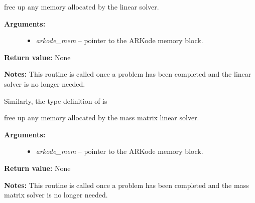 \documentclass[letterpaper,10pt,english]{sphinxmanual}
\begin{document}
\begin{fulllineitems}
\label{linear_solvers/custom:lfree}
free up any memory allocated by the linear solver.
\begin{description}
\item[{\textbf{Arguments:}}] \leavevmode\begin{itemize}
\item {} 
\emph{arkode\_mem} -- pointer to the ARKode memory block.

\end{itemize}

\end{description}

\textbf{Return value:}  None

\textbf{Notes:}  This routine is called once a problem has been
completed and the linear solver is no longer needed.

\end{fulllineitems}


Similarly, the type definition of {\hyperref[linear_solvers/custom:mfree]{}} is

\begin{fulllineitems}
\label{linear_solvers/custom:mfree}
free up any memory allocated by the mass matrix linear solver.
\begin{description}
\item[{\textbf{Arguments:}}] \leavevmode\begin{itemize}
\item {} 
\emph{arkode\_mem} -- pointer to the ARKode memory block.

\end{itemize}

\end{description}

\textbf{Return value:}  None

\textbf{Notes:}  This routine is called once a problem has been
completed and the mass matrix solver is no longer needed.

\end{fulllineitems}
\end{document}
